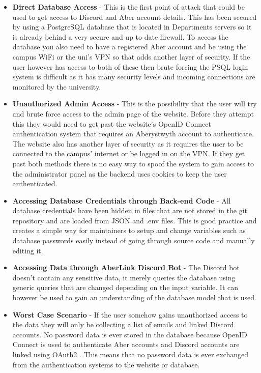 \begin{itemize}
	\item \textbf{Direct Database Access} - This is the first point of attack that could be used to get access to Discord and Aber account details. This has been secured by using a PostgreSQL \cite{psql} database that is located in Departments servers so it is already behind a very secure and up to date firewall. To access the database you also need to have a registered Aber account and be using the campus WiFi or the uni's VPN so that adds another layer of security. If the user however has access to both of these then brute forcing the PSQL login system is difficult as it has many security levels and incoming connections are monitored by the university.
	\item \textbf{Unauthorized Admin Access} - This is the possibility that the user will try and brute force access to the admin page of the website. Before they attempt this they would need to get past the website's OpenID Connect \cite{OpenID} authentication system that requires an Aberystwyth account to authenticate. The website also has another layer of security as it requires the user to be connected to the campus' internet or be logged in on the VPN. If they get past both methods there is no easy way to spoof the system to gain access to the administrator panel as the backend uses cookies to keep the user authenticated.
	\item \textbf{Accessing Database Credentials through Back-end Code} - All database credentials have been hidden in files that are not stored in the git repository and are loaded from JSON and .env files. This is good practice and creates a simple way for maintainers to setup and change variables such as database passwords easily instead of going through source code and manually editing it.
	\item \textbf{Accessing Data through AberLink Discord Bot} - The Discord bot doesn't contain any sensitive data, it merely queries the database using generic queries that are changed depending on the input variable. It can however be used to gain an understanding of the database model that is used.
	\item \textbf{Worst Case Scenario} - If the user somehow gains unauthorized access to the data they will only be collecting a list of emails and linked Discord accounts. No password data is ever stored in the database because  OpenID Connect \cite{OpenID} is used to authenticate Aber accounts and Discord accounts are linked using OAuth2 \cite{oauth2}. This means that no password data is ever exchanged from the authentication systems to the website or database.
\end{itemize}

